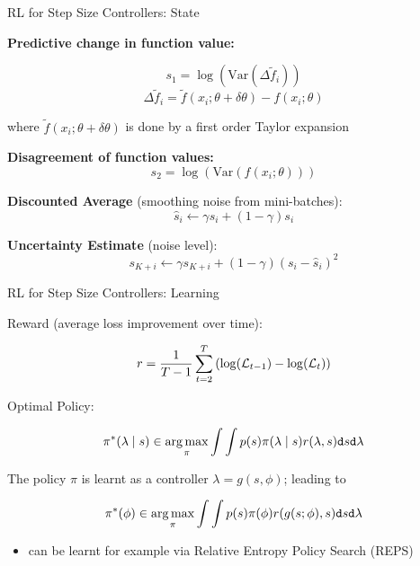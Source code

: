 \begin{frame}[c]{RL for Step Size Controllers: State }

\textbf{Predictive change in function value:}

$$s_1 = \log \left( \text{Var}(\Delta \tilde{f}_i ) \right)$$
$$\Delta \tilde{f}_i = \tilde{f}(x_i; \theta + \delta \theta) - f(x_i; \theta)$$

where $\tilde{f}(x_i; \theta + \delta \theta)$ is done by a first order Taylor expansion

\pause
\textbf{Disagreement of function values:}
$$ s_2 = \log \left(\text{Var}(f(x_i; \theta)) \right)$$

\pause

\textbf{Discounted Average} (smoothing noise from mini-batches):
$$\hat{s}_i \leftarrow \gamma \hat{s_i} + (1 - \gamma) s_i$$

\pause

\textbf{Uncertainty Estimate} (noise level):
$$s_{K+i} \leftarrow \gamma s_{K+i} + (1-\gamma) (s_i - \hat{s}_i)^2$$


\end{frame}
\begin{frame}[c]{RL for Step Size Controllers: Learning }

Reward (average loss improvement over time):

$$r = \frac{1}{T-1} \sum_{t=2}^T \left(\log(\mathcal{L}_{t-1}) - \log(\mathcal{L}_t)\right)$$

\pause

Optimal Policy:

$$\pi^*(\lambda \mid s) \in \operatorname*{arg\,max}_{\pi} \int \int p(s) \pi(\lambda\mid s)r(\lambda,s) \texttt{d}s \texttt{d}\lambda $$

\pause

The policy $\pi$ is learnt as a controller $\lambda = g(s, \phi)$; leading to

$$\pi^*(\phi) \in \operatorname*{arg\,max}_{\pi} \int \int p(s) \pi(\phi)r(g(s;\phi),s) \texttt{d}s \texttt{d}\lambda $$

\pause

\begin{itemize}
\item can be learnt for example via Relative Entropy Policy Search (REPS) 
\end{itemize}

\end{frame}
